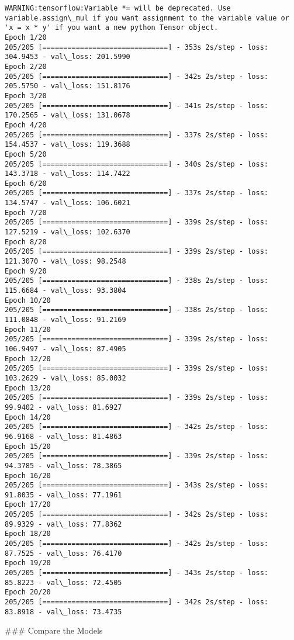 \documentclass[11pt]{article}
\begin{document}
    \begin{Verbatim}[commandchars=\\\{\}]
WARNING:tensorflow:Variable *= will be deprecated. Use variable.assign\_mul if you want assignment to the variable value or 'x = x * y' if you want a new python Tensor object.
Epoch 1/20
205/205 [==============================] - 353s 2s/step - loss: 304.9453 - val\_loss: 201.5990
Epoch 2/20
205/205 [==============================] - 342s 2s/step - loss: 205.5750 - val\_loss: 151.8176
Epoch 3/20
205/205 [==============================] - 341s 2s/step - loss: 170.2565 - val\_loss: 131.0678
Epoch 4/20
205/205 [==============================] - 337s 2s/step - loss: 154.4537 - val\_loss: 119.3688
Epoch 5/20
205/205 [==============================] - 340s 2s/step - loss: 143.3718 - val\_loss: 114.7422
Epoch 6/20
205/205 [==============================] - 337s 2s/step - loss: 134.5747 - val\_loss: 106.6021
Epoch 7/20
205/205 [==============================] - 339s 2s/step - loss: 127.5219 - val\_loss: 102.6370
Epoch 8/20
205/205 [==============================] - 339s 2s/step - loss: 121.3070 - val\_loss: 98.2548
Epoch 9/20
205/205 [==============================] - 338s 2s/step - loss: 115.6684 - val\_loss: 93.3804
Epoch 10/20
205/205 [==============================] - 338s 2s/step - loss: 111.0848 - val\_loss: 91.2169
Epoch 11/20
205/205 [==============================] - 339s 2s/step - loss: 106.9497 - val\_loss: 87.4905
Epoch 12/20
205/205 [==============================] - 339s 2s/step - loss: 103.2629 - val\_loss: 85.0032
Epoch 13/20
205/205 [==============================] - 339s 2s/step - loss: 99.9402 - val\_loss: 81.6927
Epoch 14/20
205/205 [==============================] - 342s 2s/step - loss: 96.9168 - val\_loss: 81.4863
Epoch 15/20
205/205 [==============================] - 339s 2s/step - loss: 94.3785 - val\_loss: 78.3865
Epoch 16/20
205/205 [==============================] - 343s 2s/step - loss: 91.8035 - val\_loss: 77.1961
Epoch 17/20
205/205 [==============================] - 342s 2s/step - loss: 89.9329 - val\_loss: 77.8362
Epoch 18/20
205/205 [==============================] - 342s 2s/step - loss: 87.7525 - val\_loss: 76.4170
Epoch 19/20
205/205 [==============================] - 343s 2s/step - loss: 85.8223 - val\_loss: 72.4505
Epoch 20/20
205/205 [==============================] - 342s 2s/step - loss: 83.8918 - val\_loss: 73.4735

    \end{Verbatim}

     \#\#\# Compare the Models
\end{document}
